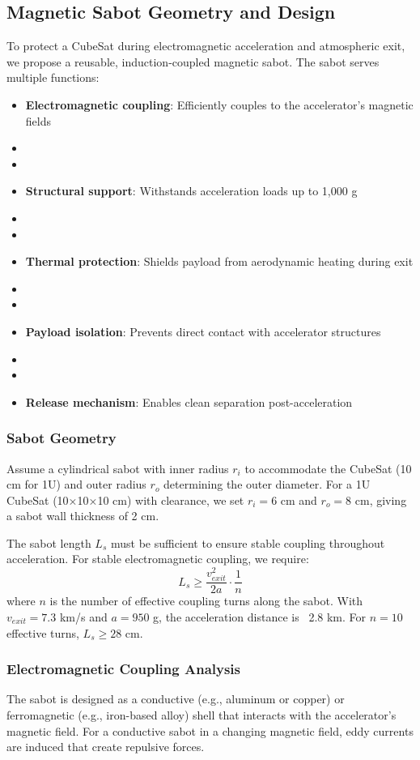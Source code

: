 \subsection{Magnetic Sabot Geometry and Design}
To protect a CubeSat during electromagnetic acceleration and atmospheric exit, we propose a reusable, induction-coupled magnetic sabot. The sabot serves multiple functions:
\begin{itemize}
    \item \textbf{Electromagnetic coupling}: Efficiently couples to the accelerator's magnetic fields
    \item \item \item \textbf{Structural support}: Withstands acceleration loads up to 1,000 g
    \item \item \item \textbf{Thermal protection}: Shields payload from aerodynamic heating during exit
    \item \item \item \textbf{Payload isolation}: Prevents direct contact with accelerator structures
    \item \item \item \textbf{Release mechanism}: Enables clean separation post-acceleration
\end{itemize}

\subsubsection{Sabot Geometry}
Assume a cylindrical sabot with inner radius $r_i$ to accommodate the CubeSat (10 cm for 1U) and outer radius $r_o$ determining the outer diameter. For a 1U CubeSat (10×10×10 cm) with clearance, we set $r_i = 6$ cm and $r_o = 8$ cm, giving a sabot wall thickness of 2 cm.

The sabot length $L_s$ must be sufficient to ensure stable coupling throughout acceleration. For stable electromagnetic coupling, we require:
\begin{equation}
L_s \geq \frac{v_{exit}^2}{2a} \cdot \frac{1}{n}
\end{equation}
where $n$ is the number of effective coupling turns along the sabot. With $v_{exit} = 7.3$ km/s and $a = 950$ g, the acceleration distance is ~2.8 km. For $n=10$ effective turns, $L_s \geq 28$ cm.

\subsubsection{Electromagnetic Coupling Analysis}
The sabot is designed as a conductive (e.g., aluminum or copper) or ferromagnetic (e.g., iron-based alloy) shell that interacts with the accelerator's magnetic field. For a conductive sabot in a changing magnetic field, eddy currents are induced that create repulsive forces.

